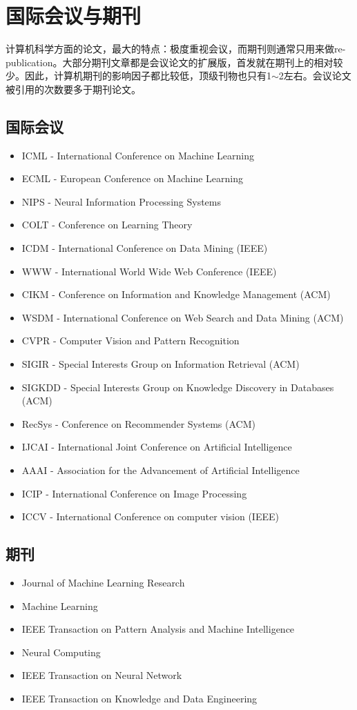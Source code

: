 \chapter{国际会议与期刊}
计算机科学方面的论文，最大的特点：极度重视会议，而期刊则通常只用来做re-publication。大部分期刊文章都是会议论文的扩展版，首发就在期刊上的相对较少。因此，计算机期刊的影响因子都比较低，顶级刊物也只有1$\sim$2左右。会议论文被引用的次数要多于期刊论文。

\section{国际会议}
\begin{itemize}
  \item ICML - International Conference on Machine Learning
  \item ECML - European Conference on Machine Learning
  \item NIPS - Neural Information Processing Systems
  \item COLT - Conference on Learning Theory
  \item ICDM -  International Conference on Data Mining (IEEE)
  \item WWW -  International World Wide Web Conference (IEEE)
  \item CIKM - Conference on Information and Knowledge Management (ACM)
  \item WSDM - International Conference on Web Search and Data Mining (ACM)
  \item CVPR - Computer Vision and Pattern Recognition
  \item SIGIR - Special Interests Group on Information Retrieval (ACM)
  \item SIGKDD - Special Interests Group on Knowledge Discovery in Databases (ACM)
  \item RecSys - Conference on Recommender Systems (ACM)
  \item IJCAI - International Joint Conference on Artificial Intelligence
  \item AAAI - Association for the Advancement of Artificial Intelligence
  \item ICIP - International Conference on Image Processing
  \item ICCV - International Conference on computer vision (IEEE)
\end{itemize}
\section{期刊}
\begin{itemize}
  \item Journal of Machine Learning Research
  \item Machine Learning
  \item IEEE Transaction on Pattern Analysis and Machine Intelligence
  \item Neural Computing
  \item IEEE Transaction on Neural Network
  \item IEEE Transaction on Knowledge and Data Engineering
\end{itemize}

